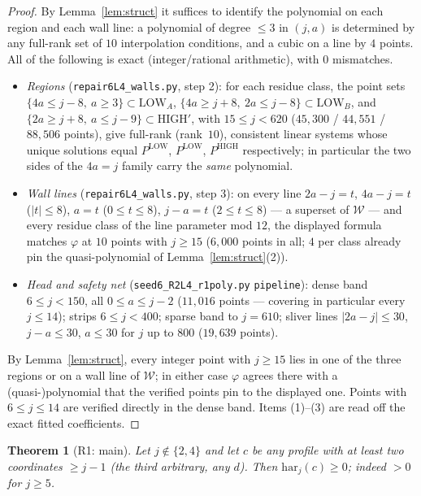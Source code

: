 \documentclass[11pt]{article}
\newtheorem{theorem}{Theorem}[section]
\theoremstyle{definition}
\theoremstyle{remark}
\newcommand{\har}{\mathrm{har}}
\begin{document}
\begin{proof}
By Lemma~\ref{lem:struct} it suffices to identify the polynomial on each
region and each wall line: a polynomial of degree $\le3$ in $(j,a)$ is
determined by any full-rank set of $10$ interpolation conditions, and a
cubic on a line by $4$ points. All of the following is exact
(integer/rational arithmetic), with $0$ mismatches.
\begin{itemize}
\item \emph{Regions} (\texttt{repair6L4\_walls.py}, step 2): for each
residue class, the point sets
$\{4a\le j-8,\ a\ge3\}\subset\mathrm{LOW}_A$,
$\{4a\ge j+8,\ 2a\le j-8\}\subset\mathrm{LOW}_B$, and
$\{2a\ge j+8,\ a\le j-9\}\subset\mathrm{HIGH}'$, with $15\le j<620$
($45{,}300$ / $44{,}551$ / $88{,}506$ points), give full-rank
(rank~$10$), consistent linear systems whose unique solutions equal
$P^{\mathrm{LOW}}$, $P^{\mathrm{LOW}}$, $P^{\mathrm{HIGH}}$ respectively;
in particular the two sides of the $4a=j$ family carry the \emph{same}
polynomial.
\item \emph{Wall lines} (\texttt{repair6L4\_walls.py}, step 3): on every
line $2a-j=t$, $4a-j=t$ ($|t|\le8$), $a=t$ ($0\le t\le8$), $j-a=t$
($2\le t\le8$) --- a superset of $\mathcal{W}$ --- and every residue class
of the line parameter mod $12$, the displayed formula matches
$\varphi$ at $10$ points with $j\ge15$ ($6{,}000$ points in all; $4$ per
class already pin the quasi-polynomial of Lemma~\ref{lem:struct}(2)).
\item \emph{Head and safety net} (\texttt{seed6\_R2L4\_r1poly.py}
\texttt{pipeline}): dense band $6\le j<150$, all $0\le a\le j-2$
($11{,}016$ points --- covering in particular every $j\le14$); strips
$6\le j<400$; sparse band to $j=610$; sliver lines $|2a-j|\le30$,
$j-a\le30$, $a\le30$ for $j$ up to $800$ ($19{,}639$ points).
\end{itemize}
By Lemma~\ref{lem:struct}, every integer point with $j\ge15$ lies in one
of the three regions or on a wall line of $\mathcal{W}$; in either case
$\varphi$ agrees there with a (quasi-)polynomial that the verified points
pin to the displayed one. Points with $6\le j\le14$ are verified directly
in the dense band. Items (1)--(3) are read off the exact fitted
coefficients.
\end{proof}

\begin{theorem}[R1: main]\label{thm:r1}
Let $j\notin\{2,4\}$ and let $c$ be any profile with at least two
coordinates $\ge j-1$ (the third arbitrary, any $d$). Then
$\har_j(c)\ge0$; indeed $>0$ for $j\ge5$.
\end{theorem}
\end{document}
